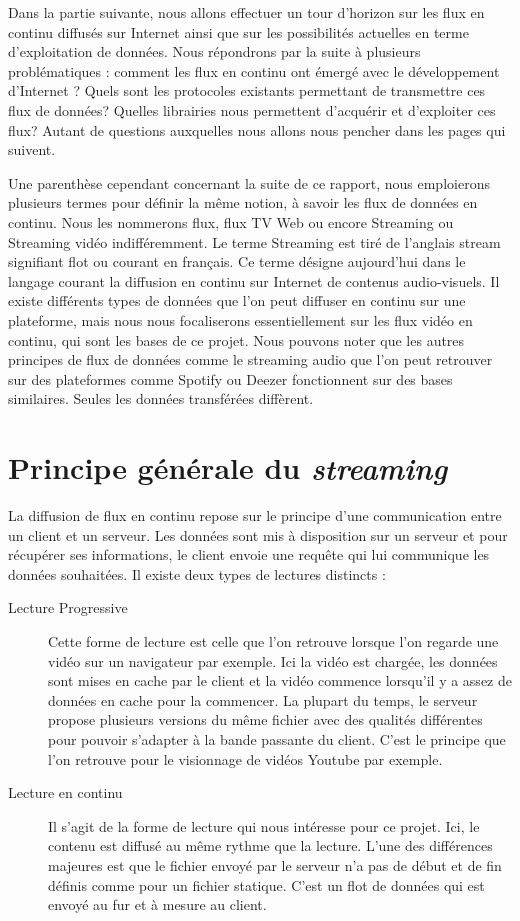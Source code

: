 \documentclass{polytech/polytech}
\begin{document}
Dans la partie suivante, nous allons effectuer un tour d’horizon sur les flux en continu diffusés sur Internet ainsi que sur les possibilités actuelles en terme d’exploitation de données. Nous répondrons par la suite à plusieurs problématiques : comment les flux en continu ont émergé avec le développement d’Internet ? Quels sont les protocoles existants permettant de transmettre ces flux de données? Quelles librairies nous permettent d’acquérir et d’exploiter ces flux? Autant de questions auxquelles nous allons nous pencher dans les pages qui suivent.

Une parenthèse cependant concernant la suite de ce rapport, nous emploierons plusieurs termes pour définir la même notion, à savoir les flux de données en continu. Nous les nommerons flux, flux TV Web ou encore Streaming ou Streaming vidéo indifféremment. Le terme Streaming est tiré de l’anglais stream signifiant flot ou courant en français. Ce terme désigne aujourd’hui dans le langage courant la diffusion en continu sur Internet de contenus audio-visuels. Il existe différents types de données que l’on peut diffuser en continu sur une plateforme, mais nous nous focaliserons essentiellement sur les flux vidéo en continu, qui sont les bases de ce projet. Nous pouvons noter que les autres principes de flux de données comme le streaming audio que l’on peut retrouver sur des plateformes comme Spotify ou Deezer fonctionnent sur des bases similaires. Seules les données transférées diffèrent.

\section{Principe générale du \textit{streaming}}

La diffusion de flux en continu repose sur le principe d’une communication entre un client et un serveur. Les données sont mis à disposition sur un serveur et pour récupérer ses informations, le client envoie une requête qui lui communique les données souhaitées. Il existe deux types de lectures distincts \cite{_definition_2017} :

\begin{description}
	\item[Lecture Progressive] Cette forme de lecture est celle que l’on retrouve lorsque l’on regarde une vidéo sur un navigateur par exemple. Ici la vidéo est chargée, les données sont mises en cache par le client et la vidéo commence lorsqu’il y a assez de données en cache pour la commencer. La plupart du temps, le serveur propose plusieurs versions du même fichier avec des qualités différentes pour pouvoir s’adapter à la bande passante du client. C’est le principe que l’on retrouve pour le visionnage de vidéos Youtube par exemple.
	\item[Lecture en continu] Il s’agit de la forme de lecture qui nous intéresse pour ce projet. Ici, le contenu est diffusé au même rythme que la lecture. L’une des différences majeures est que le fichier envoyé par le serveur n’a pas de début et de fin définis comme pour un fichier statique. C’est un flot de données qui est envoyé au fur et à mesure au client.
\end{description}
\end{document}
